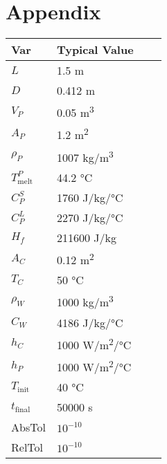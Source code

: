 \documentclass[12pt]{article}
\begin{document}
\section{Appendix}
\begin{table}[!h]
\caption{Standard Input Variables} \label{TblInputVar}
\renewcommand{\arraystretch}{1.2}
\noindent \begin{longtable*}{l l l c} 
  \toprule
  \textbf{Var} & \textbf{Typical Value}\\
  \midrule 
  $L$	& 1.5 \si[per-mode=symbol]	{\metre}
  \\
  $D$	& 0.412 \si[per-mode=symbol] {\metre}	
  \\
  $V_P$ & 0.05 \si[per-mode=symbol] {\cubic\metre}	
  \\
  $A_P$ & 1.2 \si[per-mode=symbol] {\square\metre}	
  \\
  $\rho_P$ & 1007 \si[per-mode=symbol] {\kilogram\per\cubic\metre}
  \\
  $T_\text{melt}^{P}$ &	44.2 \si[per-mode=symbol] {\celsius} 
  \\
  $C_P^S$ & 1760 \si[per-mode=symbol] {\joule\per\kilo\gram\per\celsius}
  \\
  $C_P^L$ & 2270 \si[per-mode=symbol] {\joule\per\kilo\gram\per\celsius} 
  \\
  $H_f$ & 211600 \si[per-mode=symbol] {\joule\per\kilo\gram} & 
  \\
  $A_C$ & 0.12 \si[per-mode=symbol] {\square\metre}
  \\
  $T_C$	& 50 \si[per-mode=symbol] {\celsius}
  \\
  $\rho_W$ & 1000 \si[per-mode=symbol] {\kilo\gram\per\cubic\metre} 
  \\
  $C_W$ & 4186 \si[per-mode=symbol] {\joule\per\kilo\gram\per\celsius}
  \\
  $h_C$ & 1000 \si[per-mode=symbol] {\watt\per\square\metre\per\celsius}
  \\
  $h_P$ & 1000 \si[per-mode=symbol] {\watt\per\square\metre\per\celsius} 
  \\
  $T_\text{init}$ & 40 \si[per-mode=symbol] {\celsius} 
  \\
  $t_\text{final}$ & 50000 \si[per-mode=symbol] {\second} 
  \\
  AbsTol & $10^{-10}$
  \\
  RelTol & $10^{-10}$
  \\
  \bottomrule
\end{longtable*}
\end{table}
\end{document}
